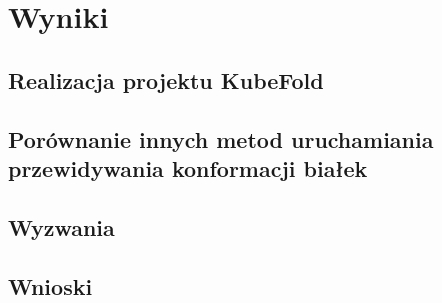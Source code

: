 \chapter{Wyniki}


\section{Realizacja projektu KubeFold}


\section{Porównanie innych metod uruchamiania przewidywania konformacji białek}


\section{Wyzwania}


\section{Wnioski}